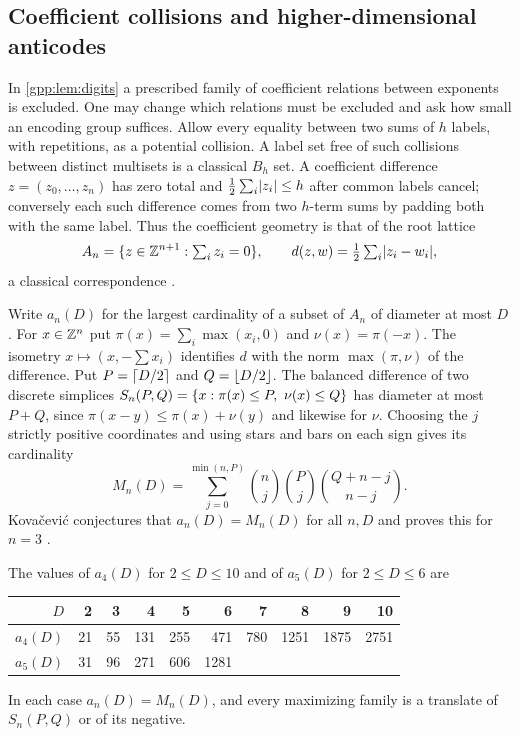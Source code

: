 \subsection{Coefficient collisions and higher-dimensional anticodes}\label{gpp:sec:lattice}
{\raggedright{}}

In \cref{gpp:lem:digits} a prescribed family of coefficient relations between exponents
is excluded. One may change which relations must be excluded and ask how small an
encoding group suffices. Allow every equality between two sums of $h$ labels, with
repetitions, as a potential collision. A label set free of such collisions between
distinct multisets is a classical $B_h$ set. A coefficient difference
$z=(z_0,\ldots,z_n)$ has zero total and $\tfrac12\sum_i\lvert z_i\rvert\le h$ after common
labels cancel; conversely each such difference comes from two $h$-term sums by padding
both with the same label. Thus the coefficient geometry is that of the root lattice
\[
 A_n=\{z\in\mathbb{Z}^{n+1}:\textstyle\sum_iz_i=0\},\qquad
 d(z,w)=\tfrac12\textstyle\sum_i\lvert z_i-w_i\rvert,
\]
a classical correspondence \cite{Kovacevic2017Improved}.

Write $a_n(D)$ for the largest cardinality of a subset of $A_n$ of diameter at most $D$.
For $x\in\mathbb{Z}^n$ put $\pi(x)=\sum_i\max(x_i,0)$ and $\nu(x)=\pi(-x)$. The isometry
$x\mapsto(x,-\sum x_i)$ identifies $d$ with the norm $\max(\pi,\nu)$ of the difference.
Put $P=\lceil D/2\rceil$ and $Q=\lfloor D/2\rfloor$. The balanced difference of two discrete
simplices $S_n(P,Q)=\{x:\pi(x)\le P,\ \nu(x)\le Q\}$ has diameter at most $P+Q$, since
$\pi(x-y)\le\pi(x)+\nu(y)$ and likewise for $\nu$. Choosing the $j$ strictly positive
coordinates and using stars and bars on each sign gives its cardinality
\[
 M_n(D)=\sum_{j=0}^{\min(n,P)}\binom nj\binom Pj\binom{Q+n-j}{n-j}.
\]
Kova\v{c}evi\'c conjectures that $a_n(D)=M_n(D)$ for all $n,D$
\cite[Conjecture~7.1]{Kovacevic2026Isodiametric} and proves this for $n=3$
\cite[Theorem~1.1]{Kovacevic2026Isodiametric}.

\begin{theorem}\label{gpp:thm:anticodes}
The values of $a_4(D)$ for $2\le D\le10$ and of $a_5(D)$ for $2\le D\le6$ are
\begin{center}
\begin{tabular}{@{}r*{9}{r}@{}}\toprule
$D$ & 2 & 3 & 4 & 5 & 6 & 7 & 8 & 9 & 10\\\midrule
$a_4(D)$ & 21 & 55 & 131 & 255 & 471 & 780 & 1251 & 1875 & 2751\\
$a_5(D)$ & 31 & 96 & 271 & 606 & 1281 & & & &\\\bottomrule
\end{tabular}
\end{center}
In each case $a_n(D)=M_n(D)$, and every maximizing family is a translate of $S_n(P,Q)$ or
of its negative.
\end{theorem}

